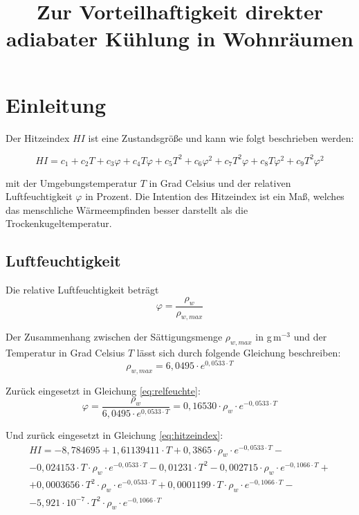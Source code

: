 \documentclass{article}
\title{Zur Vorteilhaftigkeit direkter adiabater Kühlung in Wohnräumen}
\author{}
\date{}
\begin{document}
\maketitle

\section{Einleitung}

Der Hitzeindex $HI$ ist eine Zustandsgröße und kann wie folgt beschrieben werden:

\begin{equation}
    HI = c_1 + c_2 T + c_3 \varphi + c_4 T \varphi + c_5 T^2 + c_6 \varphi^2 + c_7 T^2\varphi + c_8 T \varphi^2 + c_9 T^2 \varphi^2
    \label{eq:hitzeindex}
\end{equation}

mit der Umgebungstemperatur $T$ in Grad Celsius und der relativen Luftfeuchtigkeit $\varphi$ in Prozent.
Die Intention des Hitzeindex ist ein Maß, welches das menschliche Wärmeempfinden besser darstellt als die Trockenkugeltemperatur.

\subsection{Luftfeuchtigkeit}
Die relative Luftfeuchtigkeit beträgt
\begin{equation}
    \varphi = \frac{\rho_w}{\rho_{w, max}}
    \label{eq:relfeuchte}
\end{equation}

Der Zusammenhang zwischen der Sättigungsmenge $\rho_{w, max}$ in g\,m$^{-3}$ und der Temperatur in Grad Celsius $T$ lässt sich durch folgende Gleichung beschreiben:
\begin{equation}
    \rho_{w, max} = 6,0495 \cdot e^{0,0533 \cdot T}
    \label{eq:sättigung}
\end{equation}

Zurück eingesetzt in Gleichung \ref{eq:relfeuchte}:
\begin{equation}
    \varphi = \frac{\rho_w}{6,0495 \cdot e^{0,0533 \cdot T}} = 0,16530 \cdot \rho_w \cdot e^{-0,0533 \cdot T}
\end{equation}

Und zurück eingesetzt in Gleichung \ref{eq:hitzeindex}:
\begin{multline}
    HI = -8,784695 + 1,61139411 \cdot T + 0,3865 \cdot \rho_w \cdot e^{-0,0533 \cdot T} - \\ - 0,024153 \cdot T \cdot \rho_w \cdot e^{-0,0533 \cdot T} - 0,01231 \cdot T^2 - 0,002715 \cdot \rho_w \cdot e^{-0,1066 \cdot T} + \\ + 0,0003656 \cdot T^2 \cdot \rho_w \cdot e^{-0,0533 \cdot T} + 0,0001199 \cdot T \cdot \rho_w \cdot e^{-0,1066 \cdot T} - \\ - 5,921 \cdot 10^{-7} \cdot T^2 \cdot \rho_w \cdot e^{-0,1066 \cdot T}
\end{multline}
\end{document}
